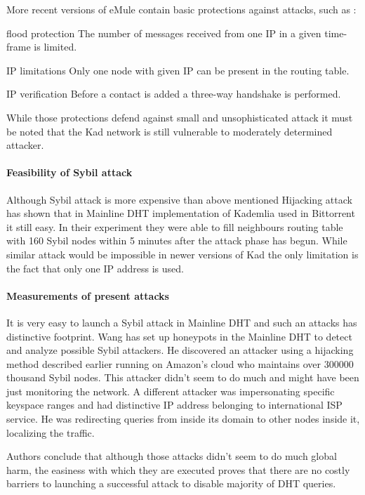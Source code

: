 More recent versions of eMule contain basic protections against attacks, such
as \cite{tim11}:
\begin{description}
  \item{flood protection} The number of messages received from one IP in a given
    time-frame is limited.
  \item{IP limitations} Only one node with given IP can be present in the
    routing table.
  \item{IP verification} Before a contact is added a three-way handshake is
    performed.
\end{description}

While those protections defend against small and unsophisticated attack it must
be noted that the Kad network is still vulnerable to moderately determined
attacker.

\paragraph{Feasibility of Sybil attack}
Although Sybil attack is more expensive than above mentioned Hijacking attack
\cite{tim11} has shown that in Mainline DHT implementation of Kademlia used in
Bittorrent it still easy. In their experiment they were able to fill neighbours
routing table with 160 Sybil nodes within 5 minutes after the attack phase has
begun. While similar attack would be impossible in newer versions of Kad the
only limitation is the fact that only one IP address is used.

\paragraph{Measurements of present attacks}
It is very easy to launch a Sybil attack in Mainline DHT and such an attacks has
distinctive footprint. Wang \cite{Wan12} has set up honeypots in the Mainline
DHT to detect and analyze possible Sybil attackers. He discovered an attacker
using a hijacking method described earlier running on Amazon's cloud who
maintains over 300000 thousand Sybil nodes. This attacker didn't seem to do much
and might have been just monitoring the network. A different attacker was
impersonating specific keyspace ranges and had distinctive IP address belonging
to international ISP service. He was redirecting queries from inside its domain
to other nodes inside it, localizing the traffic.

Authors conclude that although those attacks didn't seem to do much global harm,
the easiness with which they are executed proves that there are no costly
barriers to launching a successful attack to disable majority of DHT queries.
